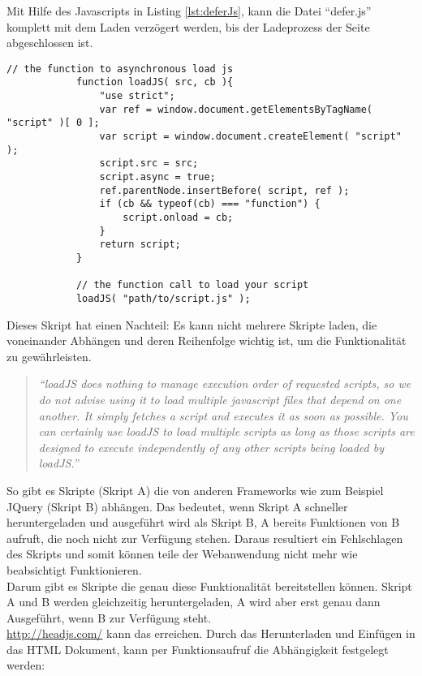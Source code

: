 			Mit Hilfe des Javascripts in Listing \ref{lst:deferJs}, kann die Datei "`defer.js"' komplett mit dem Laden verzögert werden, bis der Ladeprozess der Seite abgeschlossen ist.\\
	
			\begin{lstlisting}[captionpos=b, caption=Javascript nach \autocite{deferJS}, label=lst:deferJs]
			// the function to asynchronous load js
			function loadJS( src, cb ){
				"use strict";
				var ref = window.document.getElementsByTagName( "script" )[ 0 ];
				var script = window.document.createElement( "script" );
				script.src = src;
				script.async = true;
				ref.parentNode.insertBefore( script, ref );
				if (cb && typeof(cb) === "function") {
					script.onload = cb;
				}
				return script;
			}

			// the function call to load your script
			loadJS( "path/to/script.js" );
			\end{lstlisting}

			Dieses Skript hat einen Nachteil: Es kann nicht mehrere Skripte laden, die voneinander Abhängen und deren Reihenfolge wichtig ist, um die Funktionalität zu gewährleisten. 

			\begin{quote}
				\textit{"`loadJS does nothing to manage execution order of requested scripts, so we do not advise using it to load multiple javascript files that depend on one another. It simply fetches a script and executes it as soon as possible. You can certainly use loadJS to load multiple scripts as long as those scripts are designed to execute independently of any other scripts being loaded by loadJS."'\autocite{deferJS}}
			\end{quote}

			So gibt es Skripte (Skript A) die von anderen Frameworks wie zum Beispiel JQuery (Skript B) abhängen. Das bedeutet, wenn Skript A schneller heruntergeladen und ausgeführt wird als Skript B, A bereits Funktionen von B aufruft, die noch nicht zur Verfügung stehen. Daraus resultiert ein Fehlschlagen des Skripts und somit können teile der Webanwendung nicht mehr wie beabsichtigt Funktionieren.\\

			Darum gibt es Skripte die genau diese Funktionalität bereitstellen können. Skript A und B werden gleichzeitig heruntergeladen, A wird aber erst genau dann Ausgeführt, wenn B zur Verfügung steht.\\

			\url{http://headjs.com/} kann das erreichen. Durch das Herunterladen und Einfügen in das HTML Dokument, kann per Funktionsaufruf die Abhängigkeit festgelegt werden:


